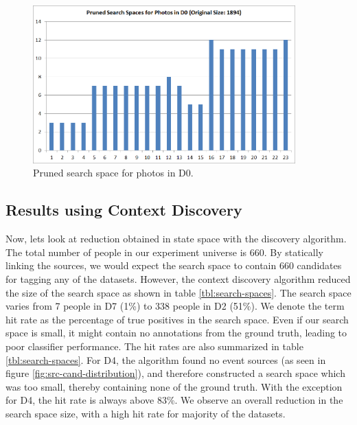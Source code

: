 \begin{figure}[t]
\centering
\includegraphics[width=0.9\textwidth]{media/reduced-list-sizes-d0.png}
\caption{Pruned search space for photos in D0.}
\label{fig:exp-vldb-all-cx}
\end{figure}

\subsection{Results using Context Discovery}
Now, lets look at reduction obtained in state space with the discovery algorithm. The total number of people in our experiment universe is 660. By statically linking the sources, we would expect the search space to contain 660 candidates for tagging any of the datasets. However, the context discovery algorithm reduced the size of the search space as shown in table \ref{tbl:search-spaces}. The search space varies from 7 people in D7 (1\%) to 338 people in D2 (51\%). We denote the term hit rate as the percentage of true positives in the search space. Even if our search space is small, it might contain no annotations from the ground truth, leading to poor classifier performance. The hit rates are also summarized in table \ref{tbl:search-spaces}. For D4, the algorithm found no event sources (as seen in figure \ref{fig:src-cand-distribution}), and therefore constructed a search space which was too small, thereby containing none of the ground truth. With the exception for D4, the hit rate is always above 83\%. We observe an overall reduction in the search space size, with a high hit rate for majority of the datasets. 

